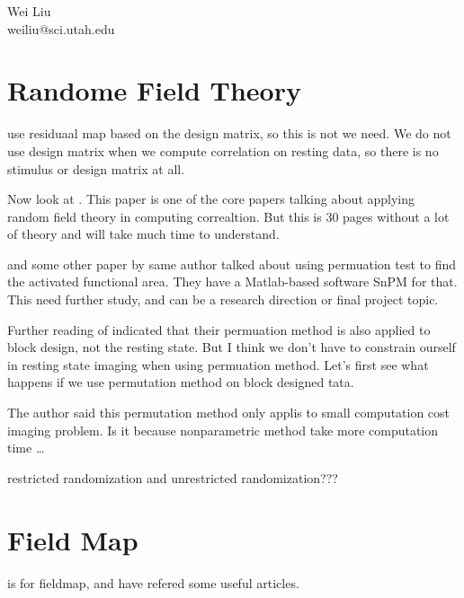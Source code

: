 \documentclass[fleqn]{article}
\begin{document}

Wei Liu\\
weiliu@sci.utah.edu

\section{Randome Field Theory}
\citet{Kiebel1999} use residuaal map based on the design matrix, so this is not we need. We do not use design matrix when we compute correlation on resting data, so there is no stimulus or design matrix at all. 

Now look at \citet{Cao99thegeometry}. This paper is one of the core papers talking about applying random field theory in computing correaltion. But this is 30 pages without a lot of theory and will take much time to understand.

\citet{tom_nonpar} and some other paper by same author\citep{tom_rft_meg, tom_nonstat, tom_fwe} talked about using permuation test to find the activated functional area. They have a Matlab-based software SnPM for that. This need further study, and can be a research direction or final project topic.

Further reading of \citet{tom_nonpar} indicated that their permuation method is also applied to block design, not the resting state. But I think we don't have to constrain ourself in resting state imaging when using permuation method. Let's first see what happens if we use permutation method on block designed tata.

The author said this permutation method only applis to small computation cost imaging problem. Is it because nonparametric method take more computation time \dots

restricted randomization and unrestricted randomization???

\section{Field Map}

\citet{Elliott20041005} is for fieldmap, and have refered some useful articles.




\end{document}
